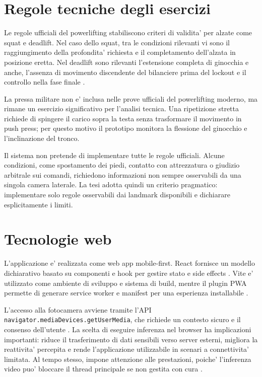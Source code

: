 \section{Regole tecniche degli esercizi}

Le regole ufficiali del powerlifting stabiliscono criteri di validita' per alzate come squat e deadlift. Nel caso dello squat, tra le condizioni rilevanti vi sono il raggiungimento della profondita' richiesta e il completamento dell'alzata in posizione eretta. Nel deadlift sono rilevanti l'estensione completa di ginocchia e anche, l'assenza di movimento discendente del bilanciere prima del lockout e il controllo nella fase finale \cite{ipfRules2024}.

La pressa militare non e' inclusa nelle prove ufficiali del powerlifting moderno, ma rimane un esercizio significativo per l'analisi tecnica. Una ripetizione stretta richiede di spingere il carico sopra la testa senza trasformare il movimento in push press; per questo motivo il prototipo monitora la flessione del ginocchio e l'inclinazione del tronco.

Il sistema non pretende di implementare tutte le regole ufficiali. Alcune condizioni, come spostamento dei piedi, contatto con attrezzatura o giudizio arbitrale sui comandi, richiedono informazioni non sempre osservabili da una singola camera laterale. La tesi adotta quindi un criterio pragmatico: implementare solo regole osservabili dai landmark disponibili e dichiarare esplicitamente i limiti.

\section{Tecnologie web}

L'applicazione e' realizzata come web app mobile-first. React fornisce un modello dichiarativo basato su componenti e hook per gestire stato e side effects \cite{reactDocs2026}. Vite e' utilizzato come ambiente di sviluppo e sistema di build, mentre il plugin PWA permette di generare service worker e manifest per una esperienza installabile \cite{viteDocs2026,vitePwaDocs2026,mdnPwa2026}.

L'accesso alla fotocamera avviene tramite l'API \texttt{navigator.mediaDevices.getUserMedia}, che richiede un contesto sicuro e il consenso dell'utente \cite{mdnGetUserMedia2026}. La scelta di eseguire inferenza nel browser ha implicazioni importanti: riduce il trasferimento di dati sensibili verso server esterni, migliora la reattivita' percepita e rende l'applicazione utilizzabile in scenari a connettivita' limitata. Al tempo stesso, impone attenzione alle prestazioni, poiche' l'inferenza video puo' bloccare il thread principale se non gestita con cura \cite{mediapipePoseWeb2026}.
